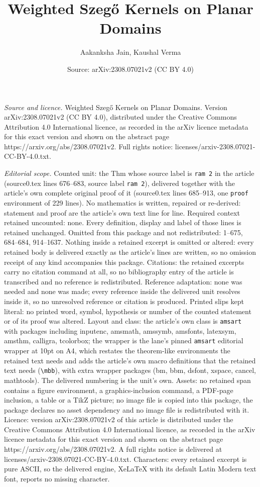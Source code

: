 \documentclass[10pt,a4paper]{amsart}
\title[Weighted Szeg\H{o} Kernels on Planar Domains]{Weighted Szeg\H{o} Kernels on Planar Domains}
\author{Aakanksha Jain, Kaushal Verma}
\date{Source: arXiv:2308.07021v2 (CC BY 4.0)}
\begin{document}
\maketitle

\noindent\emph{Source and licence.} Weighted Szeg\H{o} Kernels on Planar Domains. Version arXiv:2308.07021v2 (CC BY 4.0), distributed under the Creative Commons Attribution 4.0 International licence, as recorded in the arXiv licence metadata for this exact version and shown on the abstract page https://arxiv.org/abs/2308.07021v2. Full rights notice: licenses/arxiv-2308.07021-CC-BY-4.0.txt.\par\smallskip

\noindent\textit{Editorial scope.} Counted unit: the Thm whose source label is \texttt{ram 2} in the article (source0.tex lines 676--683, source label \texttt{ram 2}), delivered together with the article's own complete original proof of it (source0.tex lines 685--913, one \texttt{proof} environment of 229 lines). No mathematics is written, repaired or re-derived: statement and proof are the article's own text line for line. Required context retained uncounted: none. Every definition, display and label of those lines is retained unchanged. Omitted from this package and not redistributed: 1--675, 684--684, 914--1637. Nothing inside a retained excerpt is omitted or altered: every retained body is delivered exactly as the article's lines are written, so no omission receipt of any kind accompanies this package. Citations: the retained excerpts carry no citation command at all, so no bibliography entry of the article is transcribed and no reference is redistributed. Reference adaptation: none was needed and none was made; every reference inside the delivered unit resolves inside it, so no unresolved reference or citation is produced. Printed slips kept literal: no printed word, symbol, hypothesis or number of the counted statement or of its proof was altered. Layout and class: the article's own class is \texttt{amsart} with packages including inputenc, amsmath, amssymb, amsfonts, latexsym, amsthm, calligra, tcolorbox; the wrapper is the lane's pinned \texttt{amsart} editorial wrapper at 10pt on A4, which restates the theorem-like environments the retained text needs and adds the article's own macro definitions that the retained text needs (\texttt{\textbackslash mbb}), with extra wrapper packages (bm, bbm, dsfont, xspace, cancel, mathtools). The delivered numbering is the unit's own. Assets: no retained span contains a figure environment, a graphics-inclusion command, a PDF-page inclusion, a table or a TikZ picture; no image file is copied into this package, the package declares no asset dependency and no image file is redistributed with it. Licence: version arXiv:2308.07021v2 of this article is distributed under the Creative Commons Attribution 4.0 International licence, as recorded in the arXiv licence metadata for this exact version and shown on the abstract page https://arxiv.org/abs/2308.07021v2. A full rights notice is delivered at licenses/arxiv-2308.07021-CC-BY-4.0.txt. Characters: every retained excerpt is pure ASCII, so the delivered engine, XeLaTeX with its default Latin Modern text font, reports no missing character.
\end{document}
